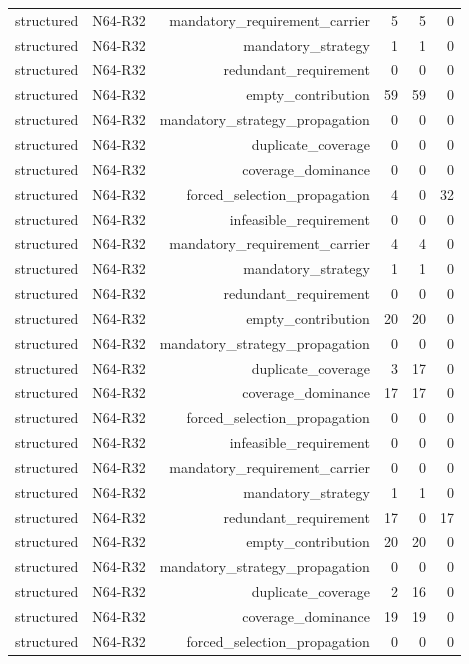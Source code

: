 {\begin{longtable}{lrrrrr}
structured & N64-R32 & mandatory\_requirement\_carrier & 5 & 5 & 0 \\
structured & N64-R32 & mandatory\_strategy & 1 & 1 & 0 \\
structured & N64-R32 & redundant\_requirement & 0 & 0 & 0 \\
structured & N64-R32 & empty\_contribution & 59 & 59 & 0 \\
structured & N64-R32 & mandatory\_strategy\_propagation & 0 & 0 & 0 \\
structured & N64-R32 & duplicate\_coverage & 0 & 0 & 0 \\
structured & N64-R32 & coverage\_dominance & 0 & 0 & 0 \\
structured & N64-R32 & forced\_selection\_propagation & 4 & 0 & 32 \\
structured & N64-R32 & infeasible\_requirement & 0 & 0 & 0 \\
structured & N64-R32 & mandatory\_requirement\_carrier & 4 & 4 & 0 \\
structured & N64-R32 & mandatory\_strategy & 1 & 1 & 0 \\
structured & N64-R32 & redundant\_requirement & 0 & 0 & 0 \\
structured & N64-R32 & empty\_contribution & 20 & 20 & 0 \\
structured & N64-R32 & mandatory\_strategy\_propagation & 0 & 0 & 0 \\
structured & N64-R32 & duplicate\_coverage & 3 & 17 & 0 \\
structured & N64-R32 & coverage\_dominance & 17 & 17 & 0 \\
structured & N64-R32 & forced\_selection\_propagation & 0 & 0 & 0 \\
structured & N64-R32 & infeasible\_requirement & 0 & 0 & 0 \\
structured & N64-R32 & mandatory\_requirement\_carrier & 0 & 0 & 0 \\
structured & N64-R32 & mandatory\_strategy & 1 & 1 & 0 \\
structured & N64-R32 & redundant\_requirement & 17 & 0 & 17 \\
structured & N64-R32 & empty\_contribution & 20 & 20 & 0 \\
structured & N64-R32 & mandatory\_strategy\_propagation & 0 & 0 & 0 \\
structured & N64-R32 & duplicate\_coverage & 2 & 16 & 0 \\
structured & N64-R32 & coverage\_dominance & 19 & 19 & 0 \\
structured & N64-R32 & forced\_selection\_propagation & 0 & 0 & 0 \\

\end{longtable}}
